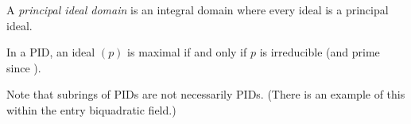 \documentclass{article}
\begin{document}
A \emph{principal ideal domain} is an integral domain where every
ideal is a principal ideal.

In a PID, an ideal $(p)$ is maximal if and only if $p$ is irreducible
(and prime since ).

Note that subrings of PIDs are not necessarily PIDs.  (There is
an example of this within the entry biquadratic field.)
\end{document}
